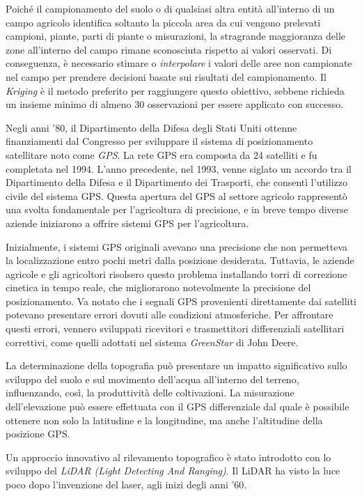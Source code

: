 Poiché il campionamento del suolo o di qualsiasi altra entità all'interno di un campo agricolo identifica soltanto la piccola area da cui vengono prelevati campioni, piante, parti di piante o misurazioni, la stragrande maggioranza delle zone all'interno del campo rimane sconosciuta rispetto ai valori osservati. Di conseguenza, è necessario stimare o \textit{interpolare} i valori delle aree non campionate nel campo per prendere decisioni basate sui risultati del campionamento. Il \textit{Kriging} è il metodo preferito per raggiungere questo obiettivo, sebbene richieda un insieme minimo di almeno 30 osservazioni per essere applicato con successo.

Negli anni '80, il Dipartimento della Difesa degli Stati Uniti ottenne finanziamenti dal Congresso per sviluppare il sistema di posizionamento satellitare noto come \textit{GPS}. La rete GPS era composta da 24 satelliti e fu completata nel 1994. L'anno precedente, nel 1993, venne siglato un accordo tra il Dipartimento della Difesa e il Dipartimento dei Trasporti, che consentì l'utilizzo civile del sistema GPS. Questa apertura del GPS al settore agricolo rappresentò una svolta fondamentale per l'agricoltura di precisione, e in breve tempo diverse aziende iniziarono a offrire sistemi GPS per l'agricoltura.

Inizialmente, i sistemi GPS originali avevano una precisione che non permetteva la localizzazione entro pochi metri dalla posizione desiderata. Tuttavia, le aziende agricole e gli agricoltori risolsero questo problema installando torri di correzione cinetica in tempo reale, che migliorarono notevolmente la precisione del posizionamento. Va notato che i segnali GPS provenienti direttamente dai satelliti potevano presentare errori dovuti alle condizioni atmosferiche. Per affrontare questi errori, vennero sviluppati ricevitori e trasmettitori differenziali satellitari correttivi, come quelli adottati nel sistema \textit{GreenStar} di John Deere.

La determinazione della topografia può presentare un impatto significativo sullo sviluppo del suolo e sul movimento dell'acqua all'interno del terreno, influenzando, così, la produttività delle coltivazioni. La misurazione dell'elevazione può essere effettuata con il GPS differenziale dal quale è possibile ottenere non solo la latitudine e la longitudine, ma anche l'altitudine della posizione GPS.

Un approccio innovativo al rilevamento topografico è stato introdotto con lo sviluppo del \textit{LiDAR (Light Detecting And Ranging)}. Il LiDAR ha visto la luce poco dopo l'invenzione del laser, agli inizi degli anni '60.

